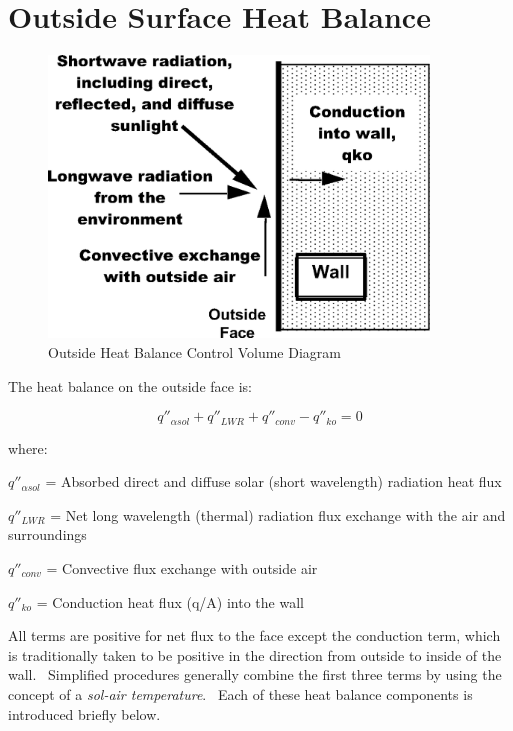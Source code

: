 \section{Outside Surface Heat Balance}\label{outside-surface-heat-balance}

\begin{figure}[hbtp] %
\centering
\includegraphics[width=0.9\textwidth, height=0.9\textheight, keepaspectratio=true]{media/image242.png}
\caption{Outside Heat Balance Control Volume Diagram \protect \label{fig:outside-heat-balance-control-volume-diagram}}
\end{figure}

The heat balance on the outside face is:

\begin{equation}
{q''_{\alpha sol}} + {q''_{LWR}} + {q''_{conv}} - {q''_{ko}} = 0
\end{equation}

where:

\(q''_{\alpha sol}\) = Absorbed direct and diffuse solar (short wavelength) radiation heat flux

\(q''_{LWR}\) = Net long wavelength (thermal) radiation flux exchange with the air and surroundings

\(q''_{conv}\) = Convective flux exchange with outside air

\(q''_{ko}\) = Conduction heat flux (q/A) into the wall


All terms are positive for net flux to the face except the conduction term, which is traditionally taken to be positive in the direction from outside to inside of the wall.~ Simplified procedures generally combine the first three terms by using the concept of a \emph{sol-air temperature}.~ Each of these heat balance components is introduced briefly below.

